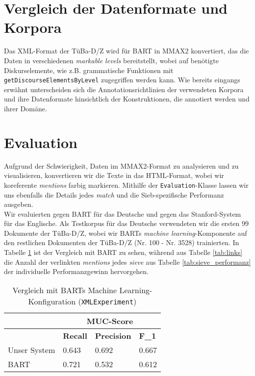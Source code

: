 \documentclass{scrartcl}
\begin{document}
\section{Vergleich der Datenformate und Korpora}
Das XML-Format der TüBa-D/Z wird für BART in MMAX2 \cite{muller2006} konvertiert, das die Daten in verschiedenen \textit{markable levels} bereitstellt, wobei auf benötigte Diskurselemente, wie z.B. grammatische Funktionen mit \texttt{getDiscourseElementsByLevel} zugegriffen werden kann. Wie bereits eingangs erwähnt unterscheiden sich die Annotationsrichtlinien der verwendeten Korpora und ihre Datenformate hinsichtlich der Konstruktionen, die annotiert werden und ihrer Domäne.

\section{Evaluation}
Aufgrund der Schwierigkeit, Daten im MMAX2-Format zu analysieren und zu visualisieren, konvertieren wir die Texte in das HTML-Format, wobei wir koreferente \textit{mentions} farbig markieren. Mithilfe der \texttt{Evaluation}-Klasse lassen wir uns ebenfalls die Details jedes \textit{match} und die Sieb-spezifische Performanz ausgeben.\\
Wir evaluierten gegen BART für das Deutsche und gegen das Stanford-System für das Englische. Als Testkorpus für das Deutsche verwendeten wir die ersten 99 Dokumente der TüBa-D/Z, wobei wir BARTs \textit{machine learning}-Komponente auf den restlichen Dokumenten der TüBa-D/Z (Nr. 100 - Nr. 3528) trainierten. In Tabelle \ref{tab:ml_vergleich} ist der Vergleich mit BART zu sehen, während aus Tabelle \ref{tab:links} die Anzahl der verlinkten \textit{mentions} jedes \textit{sieve}  aus Tabelle \ref{tab:sieve_performanz} der individuelle Performanzgewinn hervorgehen.\\
\begin{table}[h]
\begin{tabular}{l||ll|l}
& \multicolumn{3}{c}{\textbf{MUC-Score}} \\ \hline
               & \textbf{Recall}		 & \textbf{Precision} & \textbf{F\_1}    \\ \hline
Unser System 	& 0.643      & 0.692              & 0.667  \\
BART  & 0.721 		 & 0.532     & 0.612
          
\end{tabular}
\caption{Vergleich mit BARTs Machine Learning-Konfiguration (\texttt{XMLExperiment})}
\label{tab:ml_vergleich}
\end{table}
\end{document}
